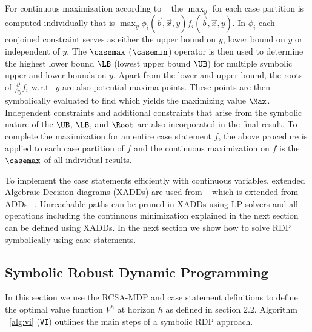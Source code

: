 For continuous maximization according to ~\cite{sdp_aaai} the $\max_y$ for each case partition
is computed individually that is $\max_y \phi_i(\vec{b},\vec{x},y) f_i(\vec{b},\vec{x},y)$.
In $\phi_i$ each conjoined constraint serves as either the upper bound on $y$, lower bound on $y$ or independent of $y$. The $\casemax$ ($\casemin$) operator is then used to determine the highest lower bound $\LB$
(lowest upper bound $\UB$) for multiple symbolic upper and lower bounds on $y$.
Apart from the lower and upper bound, the roots of $\frac{\partial}{\partial y} f_i$ 
w.r.t.\ $y$ are also potential maxima points. These points are then symbolically evaluated to find which yields the
maximizing value $\Max$.  Independent constraints and additional constraints that arise from the
symbolic nature of the $\UB$, $\LB$, and $\Root$ are also incorporated in the final result.
To complete the maximization for an entire case statement $f$, the
above procedure is applied to each case partition of $f$ and the continuous maximization on $f$ is the $\casemax$ of all individual results.  

To implement the case statements efficiently with continuous variables, extended Algebraic Decision diagrams (XADDs) are used from ~\cite{sanner_uai11} which is extended from ADDs ~\cite{bahar93add}. Unreachable paths can be pruned in XADDs using LP solvers and all operations including the continuous minimization explained in the next section can be defined using XADDs.
In the next section we show how to solve RDP symbolically using case statements.  


\subsection{Symbolic Robust Dynamic Programming}

In this section we use the RCSA-MDP and case statement definitions to define the optimal value function $V^h$ at horizon $h$ as defined in section 2.2. Algorithm ~\ref{alg:vi} (\texttt{VI}) outlines the main steps of a symbolic RDP approach.

